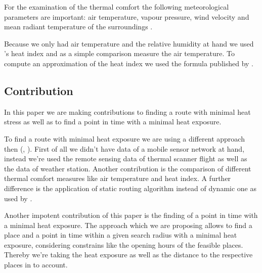 For the examination of the thermal comfort the following meteorological parameters are important: air temperature, vapour pressure,
wind velocity and mean radiant temperature of the surroundings \parencite{Matzarakis1999}.

Because we only had air temperature and the relative humidity at hand we used \citeauthor{Steadman1979}'s heat index \parencite{Steadman1979} and as a simple comparison measure the air temperature. To compute an approximation of the heat index we used the formula published by \textcite[77]{Stull2011}. 


\subsection{Contribution}

In this paper we are making contributions to finding a route with minimal heat stress as well as to find a point in time with a minimal heat exposure. 

To find a route with minimal heat exposure we are using a different approach then \citeauthor{Dang2012} (\citeyear{Dang2012}, \citeyear{Dang2013}). First of all we didn't have data of a mobile sensor network at hand, instead we're used the remote sensing data of thermal scanner flight as well as the data of weather station. Another contribution is the comparison of different thermal comfort measures like air temperature and heat index. A further difference is the application of static routing algorithm instead of dynamic one as used by \citeauthor{Dang2012}.

Another impotent contribution of this paper is the finding of a point in time with a minimal heat exposure. The approach which we are proposing allows to find a place and a point in time within a given search radius with a minimal heat exposure, considering constrains like the opening hours of the feasible places. Thereby we're taking the heat exposure as well as the distance to the respective places in to account.   



